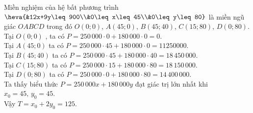 \begin{ex}
{\begin{center}
		\end{center}
		Miền nghiệm của hệ bất phương trình $\heva{&12x+9y\leq 900\\&0\leq x\leq 45\\&0\leq y\leq 80}$ là miền ngũ giác $OABCD$  trong đó  $O\left(0;0\right)$, $A\left(45;0\right)$,  $B\left(45;40\right)$,  $C\left(15;80\right)$, $D\left(0;80\right)$. \\     
		Tại $O\left(0;0\right)$ , ta có $P=250\,000\cdot0+180\,000\cdot0=0$.\\  
		Tại $A\left(45;0\right)$ ta có  $P=250\,000\cdot45+180\,000\cdot0=11250000$.\\
		Tại  $B\left(45;40\right)$ ta có $P=250\,000\cdot45+180\,000\cdot40=18\,450\,000$. \\
		Tại  $C\left(15;80\right)$ ta có  $P=250\,000\cdot15+180\,000\cdot80=18\,150\,000$. \\
		Tại $D\left(0;80\right)$  ta có  $P=250\,000\cdot0+180\,000\cdot80=14\,400\,000$.\\ 
		Ta thấy biểu thức $P=250\,000x+180\,000y$   đạt giác trị lớn nhất khi $x_0=45, \, y_0=45$.\\
		Vậy $T=x_0+2y_0=125$.		
	}
\end{ex}

